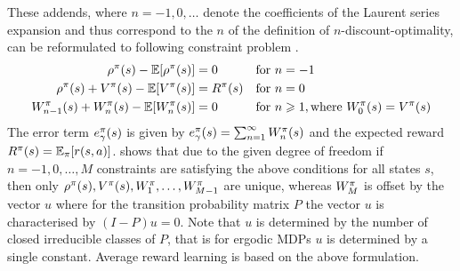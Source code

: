\documentclass[envcountsame]{llncs}
\begin{document}
These addends, where \(n=-1,0,\ldots\) denote the coefficients of the Laurent series expansion and
thus correspond to the \(n\) of the definition of \(n\)-discount-optimality, can be reformulated to
following constraint problem \citep[p.346]{MillerVeinott1969,Puterman94}.
%
\begin{align}
  \label{eq:constr1}\rho^{\pi}(s) - \operatorname*{\mathbb{E}}[\rho^{\pi}(s)] & = 0 &  & \text{for } n = -1 \\
  \label{eq:constr2}\rho^{\pi}(s) + V^{\pi}(s) - \operatorname*{\mathbb{E}}[V^{\pi}(s)] & = R^{\pi}(s) && \text{for } n = 0 \\
  \label{eq:constr3}W^{\pi}_{n-1}(s) + W^{\pi}_{n}(s) - \operatorname*{\mathbb{E}}[W^{\pi}_{n}(s)] & = 0 && \text{for } n \geqslant 1, \text{where } W_{0}^{\pi}(s) = V^{\pi}(s)
\end{align}
%
The error term \(e_{\gamma}^{\pi}(s)\) is given by
\(e_{\gamma}^{\pi}(s) = \sum_{n=1}^{\infty}W^{\pi}_{n}(s)\) and the expected reward
\(R^{\pi}(s) = \operatorname*{\mathbb{E}}_{\pi}[ r(s, a) ]\). %
%
\citet[p.343ff]{Puterman94} shows that due to the given degree of freedom if \(n=-1,0,\ldots,M\)
constraints are satisfying the above conditions for all states \(s\), then only
\(\rho^{\pi}(s), V^{\pi}(s), W^{\pi}_{1}, \ldots, W^{\pi}_{M-1}\) are unique, whereas
\(W^{\pi}_{M}\) is offset by the vector \(u\) where for the transition probability matrix \(P\) the
vector \(u\) is characterised by \((I-P)u = 0\). Note that \(u\) is determined by the number of
closed irreducible classes of \(P\), that is for ergodic MDPs \(u\) is determined by a single
constant. Average reward learning is based on the above formulation.
\end{document}
